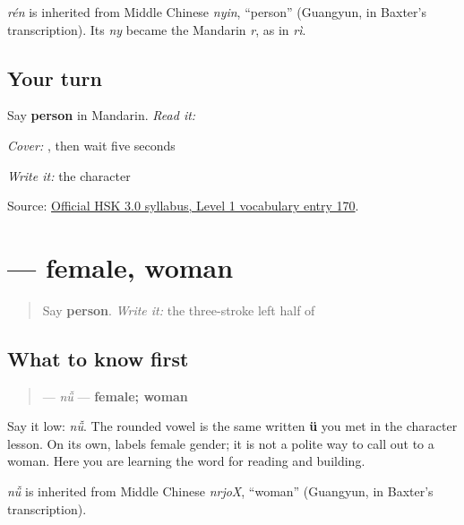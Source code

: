 \begin{cousinweb}
\textbf{} \emph{rén} is inherited from Middle Chinese \emph{nyin}, \textquotedblleft{}person\textquotedblright{} (Guangyun, in Baxter's transcription). Its \emph{ny} became the Mandarin \emph{r}, as in \emph{rì}.
\end{cousinweb}

\subsection*{Your turn}
Say \textbf{person} in Mandarin. \emph{Read it:} \textbf{}

\emph{Cover:} \textbf{}, then wait five seconds

\emph{Write it:} the character

\begin{tcolorbox}[breakable,colback=teal!4,colframe=teal!35!black,title={Before you move on}]
Source: \href{https://hsk.cn-bj.ufileos.com/3.0/\%E6\%96\%B0\%E7\%89\%88HSK\%E8\%80\%83\%E8\%AF\%95\%E5\%A4\%A7\%E7\%BA\%B21219.pdf}{Official HSK 3.0 syllabus, Level 1 vocabulary entry 170}.
\end{tcolorbox}
\section[\texorpdfstring{\zh{女} (nǚ)}{女 (nǚ)}]{ — female, woman}

\label{lesson:ZH-C12-nu}



\begin{quote}
Say \textbf{person}. \emph{Write it:} the three-stroke left half of 
\end{quote}

\subsection*{What to know first}
\begin{quote}
\textbf{} — \emph{nǚ} — \textbf{female; woman}
\end{quote}

Say it low: \emph{nǚ}. The rounded vowel is the same written \textbf{ü} you met in the character lesson. On its own,  labels female gender; it is not a polite way to call out to a woman. Here you are learning the word for reading and building.

\begin{cousinweb}
\textbf{} \emph{nǚ} is inherited from Middle Chinese \emph{nrjoX}, \textquotedblleft{}woman\textquotedblright{} (Guangyun, in Baxter's transcription).
\end{cousinweb}

